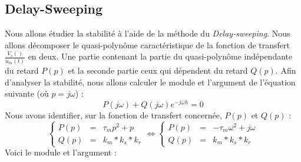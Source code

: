 		\subsection{Delay-Sweeping}
Nous allons étudier la stabilité à l'aide de la méthode du \emph{Delay-sweeping}. 
Nous allons décomposer le quasi-polynôme caractéristique de la fonction de transfert $\frac{V_s()}{u_m(t)}$ en deux. Une partie contenant la partie du quasi-polynôme indépendante du retard $P(p)$ et la seconde partie ceux qui dépendent du retard $Q(p)$. Afin d'analyser la stabilité, nous allons calculer le module et l'argument de l'équation suivante (où $p=j\omega$) :
\begin{equation}
P(j\omega) + Q(j\omega) e^{-j \omega h}  =0
\end{equation}
Nous avons identifier, sur la fonction de transfert concernée, $P(p)$ et $Q(p)$ :
\begin{equation}
\left\lbrace
\begin{array}{lcl}
P(p) &=& \tau_m p^2 + p\\
Q(p) &=& k_m*k_s*k_r
\end{array}\right.
\Leftrightarrow
\left\lbrace
\begin{array}{lcl}
P(p) &=& -\tau_m \omega^2 + j\omega \\
Q(p) &=& k_m*k_s*k_r
\end{array}\right.
\end{equation}
Voici le module et l'argument : 


